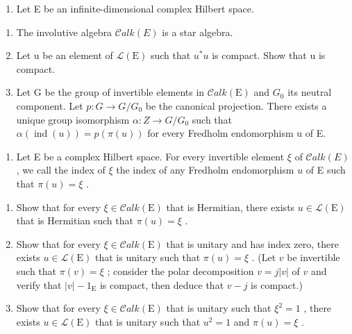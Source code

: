 \begin{enumerate}
\def\labelenumi{\arabic{enumi})}
\setcounter{enumi}{2}
\tightlist
\item
  Let E be an infinite-dimensional complex Hilbert space.
\end{enumerate}

\begin{enumerate}
\def\labelenumi{\alph{enumi})}
\item
  The involutive algebra \(\mathcal{C}alk(E)\) is a star algebra.
\item
  Let u be an element of \(\mathcal{L}(\mathrm{E})\) such that \(u^{*}u\) is compact. Show that u is compact.
\item
  Let G be the group of invertible elements in \(\mathcal{C}alk(\mathrm{E})\) and \(G_{0}\) its neutral component. Let \(p: G \to G/G_{0}\) be the canonical projection. There exists a unique group isomorphism \(\alpha: Z \to G/G_{0}\) such that \(\alpha(\operatorname{ind}(u)) = p(\pi(u))\) for every Fredholm endomorphism u of E.
\end{enumerate}

\begin{enumerate}
\def\labelenumi{\arabic{enumi})}
\setcounter{enumi}{3}
\tightlist
\item
  Let E be a complex Hilbert space. For every invertible element \(\xi\) of \(\mathcal{C}alk(E)\) , we call the index of \(\xi\) the index of any Fredholm endomorphism \(u\) of E such that \(\pi(u) = \xi\) .
\end{enumerate}

\begin{enumerate}
\def\labelenumi{\alph{enumi})}
\item
  Show that for every \(\xi \in \mathcal{C}alk(\mathrm{E})\) that is Hermitian, there exists \(u \in \mathcal{L}(\mathrm{E})\) that is Hermitian such that \(\pi(u) = \xi\) .
\item
  Show that for every \(\xi \in \mathcal{C}alk(\mathrm{E})\) that is unitary and has index zero, there exists \(u \in \mathcal{L}(\mathrm{E})\) that is unitary such that \(\pi(u) = \xi\) . (Let \(v\) be invertible such that \(\pi(v) = \xi\) ; consider the polar decomposition \(v = j|v|\) of \(v\) and verify that \(|v| - 1_{\mathrm{E}}\) is compact, then deduce that \(v - j\) is compact.)
\item
  Show that for every \(\xi \in \mathcal{C}alk(\mathrm{E})\) that is unitary such that \(\xi^2 = 1\) , there exists \(u \in \mathcal{L}(\mathrm{E})\) that is unitary such that \(u^2 = 1\) and \(\pi(u) = \xi\) .
\end{enumerate}

